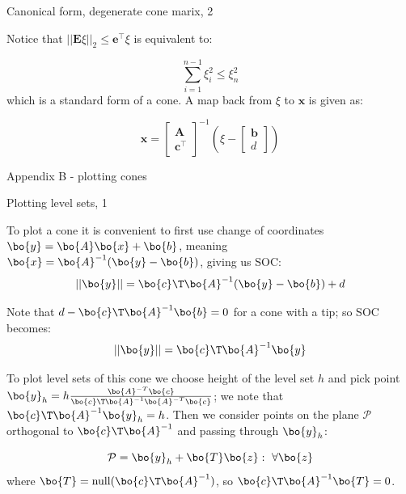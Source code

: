 \documentclass{beamer}
\begin{document}
\begin{frame}{Canonical form, degenerate cone marix, 2}
	\begin{flushleft}
		
		Notice that $||\mathbf{E}\xi||_2 \leq 
		\mathbf{e}^\top \xi$ is equivalent to:
		
		\begin{equation}
			\sum\limits_{i=1}^{n-1}\xi_i^2 \leq \xi_n^2 
		\end{equation}
		which is a standard form of a cone. A map back from $\xi$ to $\mathbf{x}$ is given as:
		
		\begin{equation}
			\mathbf{x} = \begin{bmatrix}
				\mathbf{A} \\ \mathbf{c}^\top
			\end{bmatrix}^{-1}
			\left(
			\xi - 
			\begin{bmatrix}
				\mathbf{b} \\ d
			\end{bmatrix}
			\right)
		\end{equation}
		
	\end{flushleft}
\end{frame}



\begin{frame}
	\centerline{\huge Appendix B - plotting cones}
\end{frame}


\begin{frame}{Plotting level sets, 1}
	\begin{flushleft}
		
		To plot a cone it is convenient to first use change of coordinates $\bo{y} = \bo{A}\bo{x}+\bo{b}$, meaning $\bo{x} =\bo{A}^{-1} (\bo{y} - \bo{b})$, giving us SOC:
		\begin{equation}
			||\bo{y}|| = \bo{c}\T \bo{A}^{-1} (\bo{y} - \bo{b}) + d
		\end{equation}
		
		Note that $d - \bo{c}\T \bo{A}^{-1}\bo{b} = 0$ for a cone with a tip; so SOC becomes:
		\begin{equation}
			||\bo{y}|| = \bo{c}\T \bo{A}^{-1} \bo{y}
		\end{equation}
		
		To plot level sets of this cone we choose height of the level set $h$ and pick point $\bo{y}_h = h \frac{\bo{A}^{-T} \bo{c}}{\bo{c}\T \bo{A}^{-1}\bo{A}^{-T} \bo{c}}$; we note that $\bo{c}\T \bo{A}^{-1} \bo{y}_h = h$. Then we consider points on the plane $\mathcal P$ orthogonal to $\bo{c}\T \bo{A}^{-1}$ and passing through $\bo{y}_h$:
		
		\begin{equation}
			\mathcal P = {\bo{y}_h + \bo{T}\bo{z}: \  \forall \bo{z}}
		\end{equation}
		where $\bo{T} = \text{null}(\bo{c}\T \bo{A}^{-1})$, so $\bo{c}\T \bo{A}^{-1} \bo{T} = 0$.
		
	\end{flushleft}
\end{frame}
\end{document}

